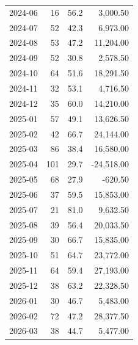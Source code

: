 \documentclass[11pt,a4paper,twoside]{article}
\begin{document}
\begin{center}
\begin{tabular}{>{\color{txtmain}}l rrr}
2024-06 & 16 & 56.2 & \textcolor{wingreen}{3,000.50} \\
2024-07 & 52 & 42.3 & \textcolor{wingreen}{6,973.00} \\
2024-08 & 53 & 47.2 & \textcolor{wingreen}{11,204.00} \\
2024-09 & 52 & 30.8 & \textcolor{wingreen}{2,578.50} \\
2024-10 & 64 & 51.6 & \textcolor{wingreen}{18,291.50} \\
2024-11 & 32 & 53.1 & \textcolor{wingreen}{4,716.50} \\
2024-12 & 35 & 60.0 & \textcolor{wingreen}{14,210.00} \\
2025-01 & 57 & 49.1 & \textcolor{wingreen}{13,626.50} \\
2025-02 & 42 & 66.7 & \textcolor{wingreen}{24,144.00} \\
2025-03 & 86 & 38.4 & \textcolor{wingreen}{16,580.00} \\
2025-04 & 101 & 29.7 & \textcolor{lossred}{-24,518.00} \\
2025-05 & 68 & 27.9 & \textcolor{lossred}{-620.50} \\
2025-06 & 37 & 59.5 & \textcolor{wingreen}{15,853.00} \\
2025-07 & 21 & 81.0 & \textcolor{wingreen}{9,632.50} \\
2025-08 & 39 & 56.4 & \textcolor{wingreen}{20,033.50} \\
2025-09 & 30 & 66.7 & \textcolor{wingreen}{15,835.00} \\
2025-10 & 51 & 64.7 & \textcolor{wingreen}{23,772.00} \\
2025-11 & 64 & 59.4 & \textcolor{wingreen}{27,193.00} \\
2025-12 & 38 & 63.2 & \textcolor{wingreen}{22,328.50} \\
2026-01 & 30 & 46.7 & \textcolor{wingreen}{5,483.00} \\
2026-02 & 72 & 47.2 & \textcolor{wingreen}{28,377.50} \\
2026-03 & 38 & 44.7 & \textcolor{wingreen}{5,477.00} \\
\bottomrule
\end{tabular}
\end{center}
\end{document}
